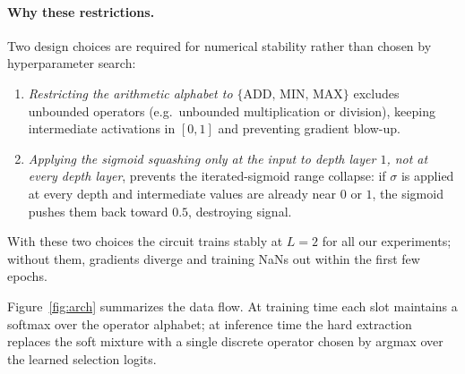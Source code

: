 \documentclass{article}
\begin{document}
\paragraph{Why these restrictions.}
Two design choices are required for numerical stability rather than chosen by hyperparameter search:
\begin{enumerate}
  \item \emph{Restricting the arithmetic alphabet to $\{\mathrm{ADD},\,\mathrm{MIN},\,\mathrm{MAX}\}$} excludes unbounded operators (e.g.\ unbounded multiplication or division), keeping intermediate activations in $[0,1]$ and preventing gradient blow-up.
  \item \emph{Applying the sigmoid squashing only at the input to depth layer $1$, not at every depth layer}, prevents the iterated-sigmoid range collapse: if $\sigma$ is applied at every depth and intermediate values are already near $0$ or $1$, the sigmoid pushes them back toward $0.5$, destroying signal.
\end{enumerate}
With these two choices the circuit trains stably at $L = 2$ for all our experiments; without them, gradients diverge and training NaNs out within the first few epochs.

Figure~\ref{fig:arch} summarizes the data flow.
At training time each slot maintains a softmax over the operator alphabet; at inference time the hard extraction replaces the soft mixture with a single discrete operator chosen by argmax over the learned selection logits.
\end{document}
